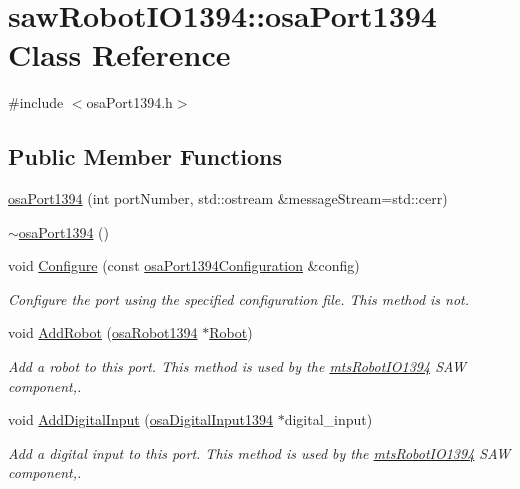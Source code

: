 \hypertarget{classsaw_robot_i_o1394_1_1osa_port1394}{}\section{saw\+Robot\+I\+O1394\+:\+:osa\+Port1394 Class Reference}
\label{classsaw_robot_i_o1394_1_1osa_port1394}


{\ttfamily \#include $<$osa\+Port1394.\+h$>$}

\subsection*{Public Member Functions}
\begin{DoxyCompactItemize}
\item 
\hyperlink{classsaw_robot_i_o1394_1_1osa_port1394_a41274223831e4ba37ce3adf64994dd53}{osa\+Port1394} (int port\+Number, std\+::ostream \&message\+Stream=std\+::cerr)
\item 
\hyperlink{classsaw_robot_i_o1394_1_1osa_port1394_a47707c30b344f6a37b83c2d5fe01a22c}{$\sim$osa\+Port1394} ()
\item 
void \hyperlink{classsaw_robot_i_o1394_1_1osa_port1394_af26490a8bda08a0af924edd6ae6849a2}{Configure} (const \hyperlink{structsaw_robot_i_o1394_1_1osa_port1394_configuration}{osa\+Port1394\+Configuration} \&config)
\begin{DoxyCompactList}\small\item\em Configure the port using the specified configuration file. This method is not. \end{DoxyCompactList}\item 
void \hyperlink{classsaw_robot_i_o1394_1_1osa_port1394_a66c47cf88533156dad37561fa2956fd8}{Add\+Robot} (\hyperlink{classsaw_robot_i_o1394_1_1osa_robot1394}{osa\+Robot1394} $\ast$\hyperlink{classsaw_robot_i_o1394_1_1osa_port1394_af2f6610aeec705984041bcc435bc5dda}{Robot})
\begin{DoxyCompactList}\small\item\em Add a robot to this port. This method is used by the \hyperlink{classmts_robot_i_o1394}{mts\+Robot\+I\+O1394} S\+A\+W component,. \end{DoxyCompactList}\item 
void \hyperlink{classsaw_robot_i_o1394_1_1osa_port1394_a54744cb8a813ad6b35b66ec277e45b70}{Add\+Digital\+Input} (\hyperlink{classsaw_robot_i_o1394_1_1osa_digital_input1394}{osa\+Digital\+Input1394} $\ast$digital\+\_\+input)
\begin{DoxyCompactList}\small\item\em Add a digital input to this port. This method is used by the \hyperlink{classmts_robot_i_o1394}{mts\+Robot\+I\+O1394} S\+A\+W component,. \end{DoxyCompactList}\item 

\end{DoxyCompactItemize}
